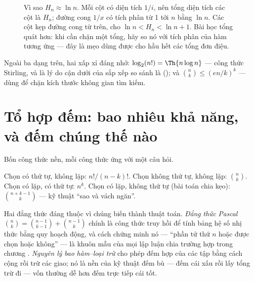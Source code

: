 \documentclass[../../algorithm.tex]{subfiles}
\begin{document}
\begin{figure}[H]\centering
{}
\caption{Vì sao \(H_n \approx \ln n\). Mỗi cột có diện tích \(1/i\), nên tổng diện tích các cột là \(H_n\); đường cong \(1/x\) có tích phân từ 1 tới \(n\) bằng \(\ln n\). Các cột kẹp đường cong từ trên, cho \(\ln n < H_n < \ln n + 1\). Bài học tổng quát hơn: khi cần chặn một tổng, hãy so nó với tích phân của hàm tương ứng --- đây là mẹo dùng được cho hầu hết các tổng đơn điệu.}
\label{fig:harmonic}
\end{figure}

Ngoài ba dạng trên, hai xấp xỉ đáng nhớ: \(\log_2(n!) = \Th{n\log n}\) --- công thức Stirling, và là lý do cận dưới của sắp xếp so sánh là  (); và \(\binom{n}{k} \le (en/k)^k\) --- dùng để chặn kích thước không gian tìm kiếm.

\section{Tổ hợp đếm: bao nhiêu khả năng, và đếm chúng thế nào}

Bốn công thức nền, mỗi công thức ứng với một câu hỏi.

Chọn có thứ tự, không lặp: \(n!/(n-k)!\). Chọn không thứ tự, không lặp: \(\binom{n}{k}\). Chọn có lặp, có thứ tự: \(n^k\). Chọn có lặp, không thứ tự (bài toán chia kẹo): \(\binom{n+k-1}{k}\) --- kỹ thuật ``sao và vách ngăn''.

Hai đẳng thức đáng thuộc vì chúng biến thành thuật toán. \emph{Đẳng thức Pascal} \(\binom{n}{k} = \binom{n-1}{k-1} + \binom{n-1}{k}\) chính là công thức truy hồi để tính bảng hệ số nhị thức bằng quy hoạch động, và cách chứng minh nó --- ``phần tử thứ \(n\) hoặc được chọn hoặc không'' --- là khuôn mẫu của mọi lập luận chia trường hợp trong chương . \emph{Nguyên lý bao hàm--loại trừ} cho phép đếm hợp của các tập bằng cách cộng rồi trừ các giao; nó là nền của kỹ thuật đếm bù --- đếm cái xấu rồi lấy tổng trừ đi --- vốn thường dễ hơn đếm trực tiếp cái tốt.
\end{document}

